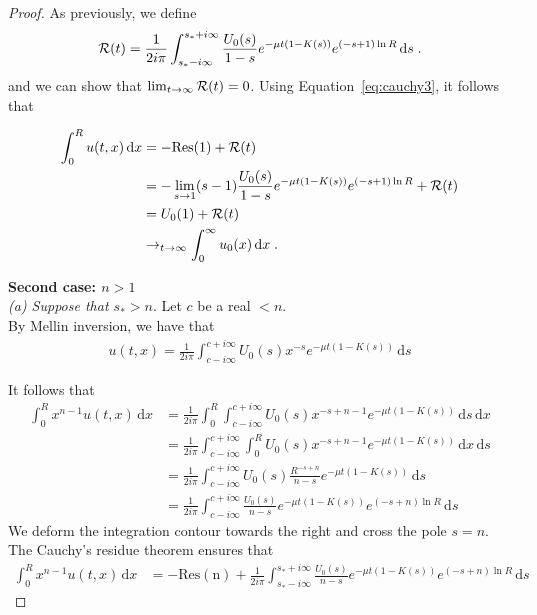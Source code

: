 \documentclass[11pt]{amsart}
\newcommand{\diff}{\,\mathrm{d}}
\begin{document}
\begin{proof}
            As previously, we define
            \begin{align*}
                \Rcal(t) = \frac{1}{2i\pi} \int_{s_*-i\infty}^{s_*+i\infty} \frac{U_0(s)}{1-s} e^{-\mu t(1 - K(s))} e^{(-s+1)\ln R} \diff s
                \eqfinp
            \end{align*}
            and we can show that $\lim_{t\to\infty}\mathcal{R}(t) = 0$. Using Equation~\ref{eq:cauchy3}, it follows that 
            
            \begin{align*}
                \int_0^R u(t,x) \diff x &= -\mathrm{Res(1)} + \Rcal(t) \\
                &= -\lim_{s \to 1} (s-1)\frac{U_0(s)}{1-s} e^{-\mu t(1 - K(s))} e^{(-s+1)\ln R}  + \Rcal(t)\\
                &= U_0(1) + \Rcal(t)\\
                &\to_{t \to \infty} \int_0^\infty u_0(x) \diff x
                \eqfinp
            \end{align*}
            
        \textbf{Second case: $ n > 1$ }\\
        
        \textit{(a) Suppose that $s_* > n$}. Let $c$ be a real $<n$. \\
            By Mellin inversion, we have that
            \begin{align*}
                u(t,x) = \frac{1}{2i\pi}\int_{c-i\infty}^{c+i\infty} U_0(s) x^{-s} e^{-\mu t(1 - K(s))} \diff s
            \end{align*}
        
        It follows that
        \begin{align*}
            \int_0^R x^{n-1}u(t,x) \diff x 
            &= \frac{1}{2i\pi} \int_0^R \int_{c-i\infty}^{c+i\infty} U_0(s) x^{-s+n-1} e^{-\mu t(1 - K(s))} \diff s \diff x \\
            &= \frac{1}{2i\pi} \int_{c-i\infty}^{c+i\infty} \int_0^R U_0(s) x^{-s+n-1} e^{-\mu t(1 - K(s))} \diff x \diff s \\
            &= \frac{1}{2i\pi} \int_{c-i\infty}^{c+i\infty} U_0(s) \frac{R^{-s+n}}{n-s} e^{-\mu t(1 - K(s))} \diff s \\
            &= \frac{1}{2i\pi} \int_{c-i\infty}^{c+i\infty} \frac{U_0(s)}{n-s} e^{-\mu t(1 - K(s))} e^{(-s+n)\ln R} \diff s
        \end{align*}
        We deform the integration contour towards the right and cross the pole $s = n$. The Cauchy's residue theorem ensures that
        \begin{align}
            \int_0^R x^{n-1}u(t,x) \diff x &= -\mathrm{Res(n)} + \frac{1}{2i\pi} \int_{s_*-i\infty}^{s_*+i\infty} \frac{U_0(s)}{n-s} e^{-\mu t(1 - K(s))} e^{(-s+n)\ln R} \diff s 
            \label{eq:cauchyn}
        \end{align}
        

\end{proof}
\end{document}
